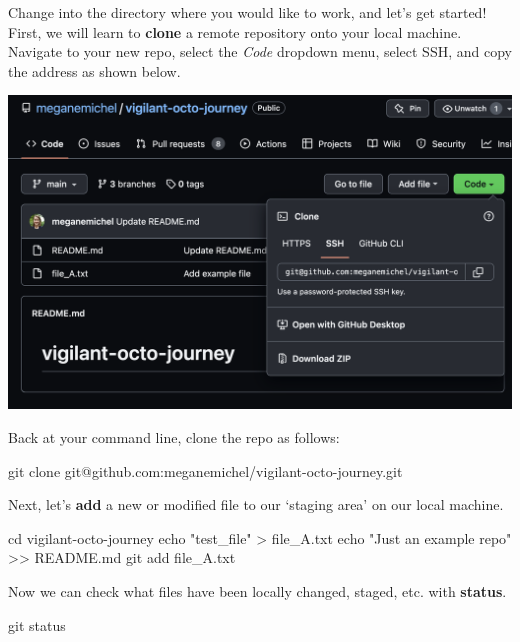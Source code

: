 \documentclass[
  letterpaper,
]{book}
\newenvironment{Shaded}{}{}
\newcommand{\BuiltInTok}[1]{\textcolor[rgb]{0.84,0.23,0.29}{#1}}
\newcommand{\FunctionTok}[1]{\textcolor[rgb]{0.44,0.26,0.76}{#1}}
\newcommand{\NormalTok}[1]{\textcolor[rgb]{0.14,0.16,0.18}{#1}}
\newcommand{\OperatorTok}[1]{\textcolor[rgb]{0.14,0.16,0.18}{#1}}
\newcommand{\StringTok}[1]{\textcolor[rgb]{0.01,0.18,0.38}{#1}}
\begin{document}
Change into the directory where you would like to work, and let's get
started! First, we will learn to \textbf{clone} a remote repository onto
your local machine. Navigate to your new repo, select the \emph{Code}
dropdown menu, select SSH, and copy the address as shown below.

\includegraphics{assets/images/chapters/introduction-to-git/git_clone.png}

Back at your command line, clone the repo as follows:

\begin{Shaded}
\begin{Highlighting}[]
\FunctionTok{git}\NormalTok{ clone git@github.com:meganemichel/vigilant{-}octo{-}journey.git}
\end{Highlighting}
\end{Shaded}

Next, let's \textbf{add} a new or modified file to our `staging area' on
our local machine.

\begin{Shaded}
\begin{Highlighting}[]
\BuiltInTok{cd}\NormalTok{ vigilant{-}octo{-}journey}
\BuiltInTok{echo} \StringTok{"test\_file"} \OperatorTok{\textgreater{}}\NormalTok{ file\_A.txt}
\BuiltInTok{echo} \StringTok{"Just an example repo"} \OperatorTok{\textgreater{}\textgreater{}}\NormalTok{ README.md}
\FunctionTok{git}\NormalTok{ add file\_A.txt}
\end{Highlighting}
\end{Shaded}

Now we can check what files have been locally changed, staged, etc. with
\textbf{status}.

\begin{Shaded}
\begin{Highlighting}[]
\FunctionTok{git}\NormalTok{ status}
\end{Highlighting}
\end{Shaded}
\end{document}
